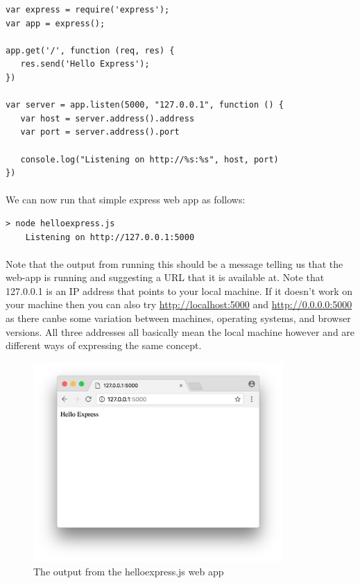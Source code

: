 \documentclass[10pt, a4paper, twosize]{article}
\begin{document}
\begin{lstlisting}
var express = require('express');
var app = express();

app.get('/', function (req, res) {
   res.send('Hello Express');
})

var server = app.listen(5000, "127.0.0.1", function () {
   var host = server.address().address
   var port = server.address().port
   
   console.log("Listening on http://%s:%s", host, port)
})
\end{lstlisting}

\paragraph{}

\paragraph{} We can now run that simple express web app as follows:

\begin{lstlisting}[style=DOS]
    > node helloexpress.js
    Listening on http://127.0.0.1:5000
\end{lstlisting}

\paragraph{} Note that the output from running this should be a message telling us that the web-app is running and suggesting a URL that it is available at. Note that 127.0.0.1 is an IP address that points to your local machine. If it doesn't work on your machine then you can also try \url{http://localhost:5000} and \url{http://0.0.0.0:5000} as there canbe some variation between machines, operating systems, and browser versions. All three addresses all basically mean the local machine however and are different ways of expressing the same concept.

\begin{figure}[H]
\includegraphics[width=0.85\textwidth]{images/express_helloexpress}
\caption{The output from the helloexpress.js web app}
\label{fig:express_helloexpress}
\end{figure}
\end{document}
